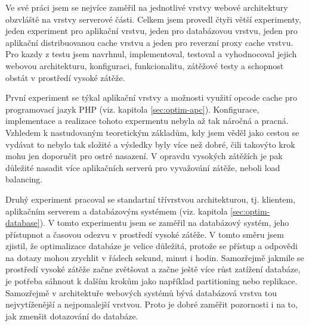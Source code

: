 \documentclass[12pt]{article}
\begin{document}
\obrazek
{}

\clearpage

\obrazek
{}



Ve své práci jsem se nejvíce zaměřil na jednotlivé vrstvy webové architektury obzvláště na vrstvy serverové části. Celkem jsem provedl čtyři větší experimenty, jeden experiment pro aplikační vrstvu, jeden pro databázovou vrstvu, jeden pro aplikační distribuovanou cache vrstvu a jeden pro reverzní proxy cache vrstvu. Pro kazdy z testu jsem navrhnul, implementoval, testoval a vyhodnocoval jejich webovou architekturu, konfiguraci, funkcionalitu, zátěžové testy a schopnost obstát v prostředí vysoké zátěže.

První experiment se týkal aplikační vrstvy a možnosti využití opcode cache pro programovací jazyk PHP (viz. kapitola \ref{sec:optim-apc}). Konfigurace, implementace a realizace tohoto expermentu nebyla až tak náročná a pracná. Vzhledem k nastudovaným teoretickým základům, kdy jsem věděl jako cestou se vydávat to nebylo tak složité a výsledky byly více než dobré, čili takovýto krok mohu jen doporučit pro ostré nasazení. V opravdu vysokých zátěžích je pak důležité nasadit více aplikačních serverů pro vyvažování zátěže, neboli load balancing.

Druhý experiment pracoval se standartní třívrstvou architekturou, tj. klientem, aplikačním serverem a databázovým systémem (viz. kapitola \ref{sec:optim-database}). V tomto experimentu jsem se zaměřil na databázový systém, jeho přístupnot a časovou odezvu v prostředí vysoké zátěže. V tomto směru jsem zjistil, že optimalizace databáze je velice důležitá, protože se přístup a odpovědi na dotazy mohou zrychlit v řádech sekund, minut i hodin. Samozřejmě jakmile se prostředí vysoké zátěže začne zvětšovat a začne ještě více růst zatížení databáze, je potřeba sáhnout k dalším krokům jako například partitioning nebo replikace. Samozřejmě v architektuře webových systémů bývá databázová vrstva tou nejvytíženější a nejpomalejší vrstvou. Proto je dobré zaměřit pozornosti i na to, jak zmenšit dotazování do databáze.
\end{document}
